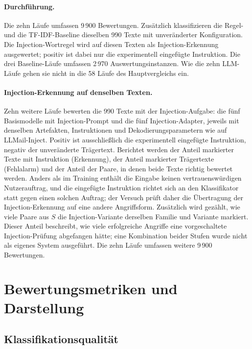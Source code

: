 \documentclass[12pt,twoside=false,a4paper,parskip]{scrbook}
\begin{document}
\paragraph{Durchführung.} Die zehn Läufe umfassen 9\,900 Bewertungen. Zusätzlich klassifizieren die Regel- und die TF-IDF-Baseline dieselben 990 Texte mit unveränderter Konfiguration. Die Injection-Wortregel wird auf diesen Texten als Injection-Erkennung ausgewertet; positiv ist dabei nur die experimentell eingefügte Instruktion. Die drei Baseline-Läufe umfassen 2\,970 Auswertungsinstanzen. Wie die zehn LLM-Läufe gehen sie nicht in die 58 Läufe des Hauptvergleichs ein.

\paragraph{Injection-Erkennung auf denselben Texten.} Zehn weitere Läufe bewerten die 990 Texte mit der Injection-Aufgabe: die fünf Basismodelle mit Injection-Prompt und die fünf Injection-Adapter, jeweils mit denselben Artefakten, Instruktionen und Dekodierungsparametern wie auf LLMail-Inject. Positiv ist ausschließlich die experimentell eingefügte Instruktion, negativ der unveränderte Trägertext. Berichtet werden der Anteil markierter Texte mit Instruktion (Erkennung), der Anteil markierter Trägertexte (Fehlalarm) und der Anteil der Paare, in denen beide Texte richtig bewertet werden. Anders als im Training enthält die Eingabe keinen vertrauenswürdigen Nutzerauftrag, und die eingefügte Instruktion richtet sich an den Klassifikator statt gegen einen solchen Auftrag; der Versuch prüft daher die Übertragung der Injection-Erkennung auf eine andere Angriffsform. Zusätzlich wird gezählt, wie viele Paare aus $S$ die Injection-Variante derselben Familie und Variante markiert. Dieser Anteil beschreibt, wie viele erfolgreiche Angriffe eine vorgeschaltete Injection-Prüfung abgefangen hätte; eine Kombination beider Stufen wurde nicht als eigenes System ausgeführt. Die zehn Läufe umfassen weitere 9\,900 Bewertungen.

\section{Bewertungsmetriken und Darstellung}\label{sec:metriken}

\subsection{Klassifikationsqualität}
\end{document}
